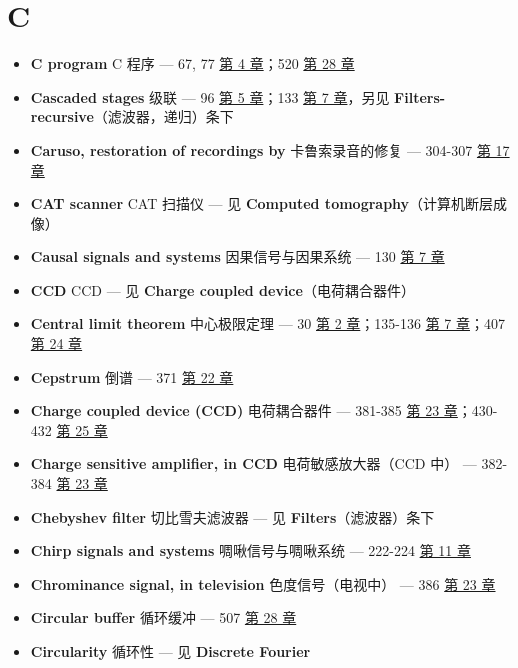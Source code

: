 \section{C}

\begin{itemize}
\tightlist
\item
  \textbf{C program} C 程序 --- 67, 77  \hyperref[ch-04]{第 4
  章}；520  \hyperref[ch-28]{第 28 章}
\item
  \textbf{Cascaded stages} 级联 --- 96  \hyperref[ch-05]{第 5
  章}；133  \hyperref[ch-07]{第 7 章}，另见 \textbf{Filters-
  recursive}（滤波器，递归）条下
\item
  \textbf{Caruso, restoration of recordings by} 卡鲁索录音的修复 ---
  304-307  \hyperref[ch-17]{第 17 章}
\item
  \textbf{CAT scanner} CAT 扫描仪 --- 见 \textbf{Computed
  tomography}（计算机断层成像）
\item
  \textbf{Causal signals and systems} 因果信号与因果系统 --- 130
   \hyperref[ch-07]{第 7 章}
\item
  \textbf{CCD} CCD --- 见 \textbf{Charge coupled device}（电荷耦合器件）
\item
  \textbf{Central limit theorem} 中心极限定理 --- 30 
  \hyperref[ch-02]{第 2 章}；135-136  \hyperref[ch-07]{第 7
  章}；407  \hyperref[ch-24]{第 24 章}
\item
  \textbf{Cepstrum} 倒谱 --- 371  \hyperref[ch-22]{第 22 章}
\item
  \textbf{Charge coupled device (CCD)} 电荷耦合器件 --- 381-385
   \hyperref[ch-23]{第 23 章}；430-432 
  \hyperref[ch-25]{第 25 章}
\item
  \textbf{Charge sensitive amplifier, in CCD} 电荷敏感放大器（CCD 中）
  --- 382-384  \hyperref[ch-23]{第 23 章}
\item
  \textbf{Chebyshev filter} 切比雪夫滤波器 --- 见
  \textbf{Filters}（滤波器）条下
\item
  \textbf{Chirp signals and systems} 啁啾信号与啁啾系统 --- 222-224
   \hyperref[ch-11]{第 11 章}
\item
  \textbf{Chrominance signal, in television} 色度信号（电视中） --- 386
   \hyperref[ch-23]{第 23 章}
\item
  \textbf{Circular buffer} 循环缓冲 --- 507 
  \hyperref[ch-28]{第 28 章}
\item
  \textbf{Circularity} 循环性 --- 见 \textbf{Discrete Fourier
}
\end{itemize}
